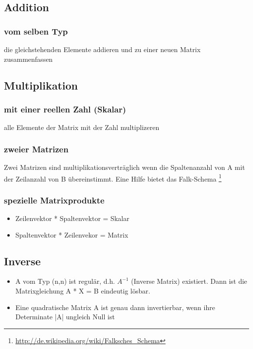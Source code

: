 \documentclass[a4paper,12pt]{scrartcl}
\begin{document}
\subsection{Addition}
\subsubsection{vom selben Typ}
die gleichstehenden Elemente addieren und zu einer neuen Matrix zusammenfassen

\subsection{Multiplikation}
\subsubsection{mit einer reellen Zahl (Skalar)}
alle Elemente der Matrix mit der Zahl multiplizeren

\subsubsection{zweier Matrizen}
Zwei Matrizen sind multiplikationsverträglich wenn die Spaltenanzahl von A mit der Zeilanzahl von B übereinstimmt. 
Eine Hilfe bietet das Falk-Schema \footnote{\url{http://de.wikipedia.org/wiki/Falksches_Schema}}

\subsubsection{spezielle Matrixprodukte}
\begin{itemize}
\item Zeilenvektor * Spaltenvektor = Skalar
\item Spaltenvektor * Zeilenvekor = Matrix
\end{itemize}


\subsection{Inverse}
\begin{itemize}
\item A vom Typ (n,n) ist regulär, d.h. $A^{-1}$ (Inverse Matrix) existiert. Dann ist die Matrixgleichung A * X = B eindeutig lösbar.
\item Eine quadratische Matrix A ist genau dann invertierbar, wenn ihre Determinate |A| ungleich Null ist
\end{itemize}
\end{document}
